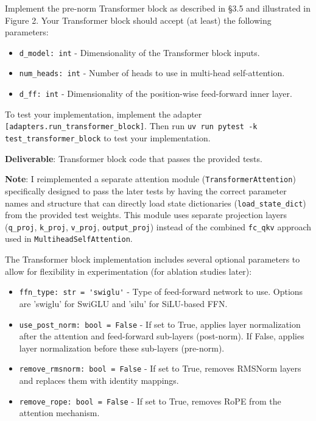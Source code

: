 
Implement the pre-norm Transformer block as described in §3.5 and illustrated in Figure 2. Your Transformer block should accept (at least) the following parameters:

\begin{itemize}
    \item \lstinline{d_model: int} - Dimensionality of the Transformer block inputs.
    \item \lstinline{num_heads: int} - Number of heads to use in multi-head self-attention.
    \item \lstinline{d_ff: int} - Dimensionality of the position-wise feed-forward inner layer.
\end{itemize}

To test your implementation, implement the adapter \lstinline{[adapters.run_transformer_block]}. Then run \lstinline{uv run pytest -k test_transformer_block} to test your implementation.

\textbf{Deliverable}: Transformer block code that passes the provided tests.

\begin{answer}
\textbf{Note}: I reimplemented a separate attention module (\lstinline{TransformerAttention}) specifically designed to pass the later tests by having the correct parameter names and structure that can directly load state dictionaries (\lstinline{load_state_dict}) from the provided test weights. This module uses separate projection layers (\lstinline{q_proj}, \lstinline{k_proj}, \lstinline{v_proj}, \lstinline{output_proj}) instead of the combined \lstinline{fc_qkv} approach used in \lstinline{MultiheadSelfAttention}.

The Transformer block implementation includes several optional parameters to allow for flexibility in experimentation (for ablation studies later):
\begin{itemize}
    \item \lstinline{ffn_type: str = 'swiglu'} - Type of feed-forward network to use. Options are 'swiglu' for SwiGLU and 'silu' for SiLU-based FFN.
    \item \lstinline{use_post_norm: bool = False} - If set to True, applies layer normalization after the attention and feed-forward sub-layers (post-norm). If False, applies layer normalization before these sub-layers (pre-norm).
    \item \lstinline{remove_rmsnorm: bool = False} - If set to True, removes RMSNorm layers and replaces them with identity mappings.
    \item \lstinline{remove_rope: bool = False} - If set to True, removes RoPE from the attention mechanism.
\end{itemize}
\end{answer}

